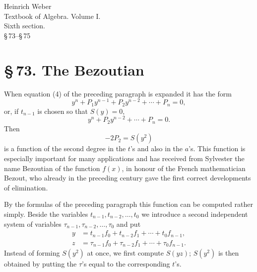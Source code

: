 \documentclass[11pt]{article}
\newcommand{\sect}[2]{\section*{\S\,#1. #2}}
\begin{document}
\begin{center}
{\large Heinrich Weber}\\[0.35em]
{\Large Textbook of Algebra. Volume I.}\\[0.35em]
{\large Sixth section.}\\[0.25em]
{\large \S\,73--\S\,75}
\end{center}

\sect{73}{The Bezoutian}

When equation (4) of the preceding paragraph is expanded it has the form
\[
 y^n+P_1y^{n-1}+P_2y^{n-2}+\cdots+P_n=0,
\]
or, if $t_{n-1}$ is chosen so that $S(y)=0$,
\begin{equation}
 y^n+P_2y^{n-2}+\cdots+P_n=0.
\tag{1}
\end{equation}
Then
\[
 -2P_2=S(y^2)
\]
is a function of the second degree in the $t$'s and also in the $a$'s. This function is especially important for many applications and has received from Sylvester the name Bezoutian of the function $f(x)$, in honour of the French mathematician Bezout, who already in the preceding century gave the first correct developments of elimination.

By the formulas of the preceding paragraph this function can be computed rather simply. Beside the variables $t_{n-1},t_{n-2},\ldots,t_0$ we introduce a second independent system of variables $\tau_{n-1},\tau_{n-2},\ldots,\tau_0$ and put
\begin{equation}
\begin{aligned}
 y&=t_{n-1}f_0+t_{n-2}f_1+\cdots+t_0f_{n-1},\\
 z&=\tau_{n-1}f_0+\tau_{n-2}f_1+\cdots+\tau_0f_{n-1}.
\end{aligned}
\tag{2}
\end{equation}
Instead of forming $S(y^2)$ at once, we first compute $S(yz)$; $S(y^2)$ is then obtained by putting the $\tau$'s equal to the corresponding $t$'s.
\end{document}
